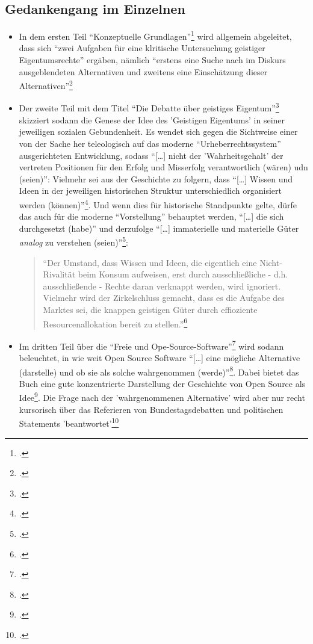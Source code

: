 \documentclass[DIV=calc,BCOR=5mm,11pt,headings=small,oneside,abstract=true, toc=bib]{scrartcl}
\begin{document}
\subsection{Gedankengang im Einzelnen}
\begin{itemize}
  \item In dem ersten Teil \enquote{Konzeptuelle
  Grundlagen}\footcite[vgl.][15ff]{Eckl2004a} wird allgemein abgeleitet,
  dass sich \enquote{zwei Aufgaben für eine klritische Untersuchung
  geistiger Eigentumsrechte} ergäben, nämlich \enquote{erstens eine
  Suche nach im Diskurs ausgeblendeten Alternativen und zweitens eine
  Einschätzung dieser Alternativen}\footcite[vgl.][43]{Eckl2004a}
  \item Der zweite Teil mit dem Titel \enquote{Die Debatte über geistiges
  Eigentum}\footcite[vgl.][45ff]{Eckl2004a} skizziert sodann die Genese
  der Idee des 'Geistigen Eigentums' in seiner jeweiligen sozialen Gebundenheit.
  Es wendet sich gegen die Sichtweise einer von der Sache her teleologisch auf
  das moderne \enquote{Urheberrechtssystem} ausgerichteten Entwicklung,
  sodass \enquote{[\ldots] nicht der 'Wahrheitsgehalt' der vertreten Positionen
  für den Erfolg und Misserfolg verantwortlich (wären) udn (seien)}:
  Vielmehr sei aus der Geschichte zu folgern, dass \enquote{[\ldots] Wissen und
  Ideen in der jeweiligen historischen Struktur unterschiedlich organisiert
  werden (können)}\footcite[vgl.][94]{Eckl2004a}. Und wenn dies für
  historische Standpunkte gelte, dürfe das auch für die moderne
  \enquote{Vorstellung} behauptet werden, \enquote{[\ldots] die sich
  durchgesetzt (habe)} und derzufolge \enquote{[\ldots] immaterielle
  und materielle Güter \emph{analog} zu verstehen
  (seien)}\footcite[vgl.][96, herv.i.O]{Eckl2004a}:
  \begin{quote} \enquote{Der Umstand, dass Wissen und Ideen, die
  eigentlich eine Nicht-Rivalität beim Konsum aufweisen, erst durch
  ausschließliche - d.h. ausschließende - Rechte daran verknappt werden,
  wird ignoriert. Vielmehr wird der Zirkelschluss gemacht, dass es die
  Aufgabe des Marktes sei, die knappen geistigen Güter durch effioziente
  Resourcenallokation bereit zu stellen.}\footcite[vgl.][96]{Eckl2004a}
  \end{quote}
  \item Im dritten Teil über die \enquote{Freie und
  Ope-Source-Software}\footcite[vgl.][101ff]{Eckl2004a} wird sodann
  beleuchtet, in wie weit Open Source Software \enquote{[\ldots] eine
  mögliche Alternative (darstelle) und ob sie als solche wahrgenommen
  (werde)}\footcite[vgl.][99]{Eckl2004a}. Dabei bietet das Buch eine gute
  konzentrierte Darstellung der Geschichte von Open Source als
  Idee\footcite[vgl.][102]{Eckl2004a}. Die Frage nach der 'wahrgenommenen
  Alternative' wird aber nur recht kursorisch über das Referieren von
  Bundestagsdebatten und politischen Statements
  'beantwortet'\footcite[vgl.][118ff]{Eckl2004a}
\end{itemize}
\end{document}
